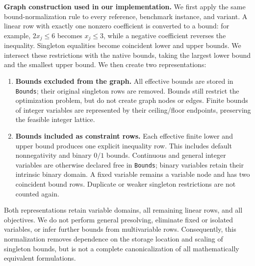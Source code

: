 \documentclass[11pt]{article}
\begin{document}
\begin{enumerate}[label=(AssoE.\arabic*),leftmargin=*]
\medskip
\textbf{Graph construction used in our implementation.}
We first apply the same bound-normalization rule to every reference,
benchmark instance, and variant. A linear row with exactly one nonzero
coefficient is converted to a bound: for example, $2x_j\leq6$ becomes
$x_j\leq3$, while a negative coefficient reverses the inequality.
Singleton equalities become coincident lower and upper bounds.
We intersect these restrictions with the native bounds, taking the
largest lower bound and the smallest upper bound. We then create two
representations:
\begin{enumerate}
\item \textbf{Bounds excluded from the graph.}
All effective bounds are stored in \texttt{Bounds}; their original
singleton rows are removed. Bounds still restrict the optimization
problem, but do not create graph nodes or edges. Finite bounds of integer
variables are represented by their ceiling/floor endpoints, preserving
the feasible integer lattice.
\item \textbf{Bounds included as constraint rows.}
Each effective finite lower and upper bound produces one explicit
inequality row. This includes default nonnegativity and binary $0/1$
bounds. Continuous and general integer variables are otherwise declared
free in \texttt{Bounds}; binary variables retain their intrinsic binary
domain. A fixed variable remains a variable node and has two coincident
bound rows. Duplicate or weaker singleton restrictions are not counted
again.
\end{enumerate}
Both representations retain variable domains, all remaining linear rows,
and all objectives. We do not perform general presolving, eliminate fixed
or isolated variables, or infer further bounds from multivariable rows.
Consequently, this normalization removes dependence on the storage
location and scaling of singleton bounds, but is not a complete
canonicalization of all mathematically equivalent formulations.


\end{enumerate}
\end{document}
